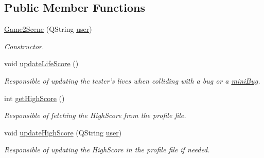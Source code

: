 \subsection*{Public Member Functions}
\begin{DoxyCompactItemize}
\item 
\hypertarget{classGame2Scene_a2bb661542400d8c3b9ac283c56ddec43}{\hyperlink{classGame2Scene_a2bb661542400d8c3b9ac283c56ddec43}{Game2\-Scene} (Q\-String \hyperlink{classGame2Scene_a03c78504fc8e5179a885307c8bf83c46}{user})}\label{classGame2Scene_a2bb661542400d8c3b9ac283c56ddec43}

\begin{DoxyCompactList}\small\item\em Constructor. \end{DoxyCompactList}\item 
\hypertarget{classGame2Scene_a316ab47115c7dfcd04d0374c7eff1195}{void \hyperlink{classGame2Scene_a316ab47115c7dfcd04d0374c7eff1195}{update\-Life\-Score} ()}\label{classGame2Scene_a316ab47115c7dfcd04d0374c7eff1195}

\begin{DoxyCompactList}\small\item\em Responsible of updating the tester's lives when colliding with a bug or a \hyperlink{classminiBug}{mini\-Bug}. \end{DoxyCompactList}\item 
int \hyperlink{classGame2Scene_aa2b1aab0dd957d2e5082d4c6352cf390}{get\-High\-Score} ()
\begin{DoxyCompactList}\small\item\em Responsible of fetching the High\-Score from the profile file. \end{DoxyCompactList}\item 
void \hyperlink{classGame2Scene_a8f2843e83fb8abbe454bf0ef0ef3c7ea}{update\-High\-Score} (Q\-String \hyperlink{classGame2Scene_a03c78504fc8e5179a885307c8bf83c46}{user})
\begin{DoxyCompactList}\small\item\em Responsible of updating the High\-Score in the profile file if needed. \end{DoxyCompactList}\end{DoxyCompactItemize}
